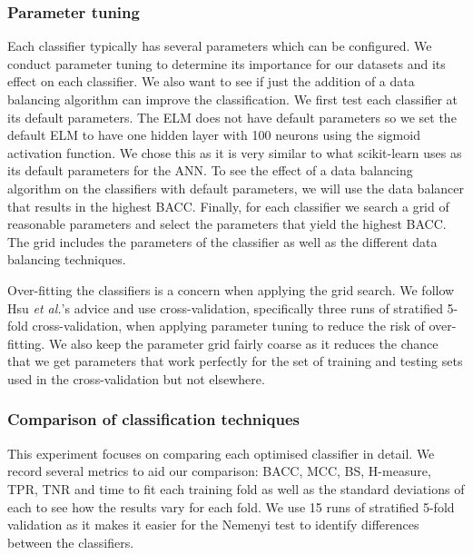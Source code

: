 \documentclass{sig-alternate-05-2015}
\begin{document}
	\subsubsection{Parameter tuning}
	\label{parameter_tuning}
	Each classifier typically has several parameters which can be configured. We conduct parameter tuning to determine its importance for our datasets and its effect on each classifier. We also want to see if just the addition of a data balancing algorithm can improve the classification. We first test each classifier at its default parameters. The ELM does not have default parameters so we set the default ELM to have one hidden layer with 100 neurons using the sigmoid activation function. We chose this as it is very similar to what scikit-learn \cite{scikit-learn} uses as its default parameters for the ANN. To see the effect of a data balancing algorithm on the classifiers with default parameters, we will use the data balancer that results in the highest BACC. Finally, for each classifier we search a grid of reasonable parameters and select the parameters that yield the highest BACC. The grid includes the parameters of the classifier as well as the different data balancing techniques.
	
	Over-fitting the classifiers is a concern when applying the grid search. We follow Hsu \textit{et al.}'s \cite{hsu2003practical} advice and use cross-validation, specifically three runs of stratified 5-fold cross-validation, when applying parameter tuning to reduce the risk of over-fitting. We also keep the parameter grid fairly coarse as it reduces the chance that we get parameters that work perfectly for the set of training and testing sets used in the cross-validation but not elsewhere.
	
	\subsubsection{Comparison of classification techniques}
	\label{comparision_of_classification_technique}
	This experiment focuses on comparing each optimised classifier in detail. We record several metrics to aid our comparison: BACC, MCC, BS, H-measure, TPR, TNR and time to fit each training fold as well as the standard deviations of each to see how the results vary for each fold. We use 15 runs of stratified 5-fold validation as it makes it easier for the Nemenyi test to identify differences between the classifiers.
	
\end{document}
